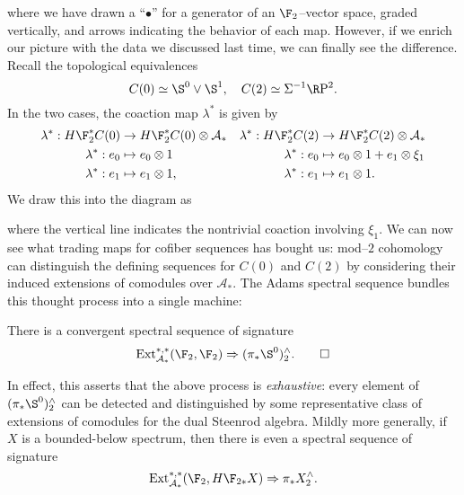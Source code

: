where we have drawn a ``$\bullet$'' for a generator of an $\F_2$--vector space, graded vertically, and arrows indicating the behavior of each map.  However, if we enrich our picture with the data we discussed last time, we can finally see the difference.  Recall the topological equivalences \[C(0) \simeq \S^0 \vee \S^1, \quad C(2) \simeq \Susp^{-1} \RP^2.\]  In the two cases, the coaction map $\lambda^*$ is given by
\begin{align*}
\lambda^*: H\F_2^* C(0) & \to H\F_2^* C(0) \otimes \mathcal A_* & \lambda^*: H\F_2^* C(2) & \to H\F_2^* C(2) \otimes \mathcal A_* \\
\lambda^*: e_0 & \mapsto e_0 \otimes 1 & \lambda^*: e_0 & \mapsto e_0 \otimes 1 + e_1 \otimes \xi_1 \\
\lambda^*: e_1 & \mapsto e_1 \otimes 1, & \lambda^*: e_1 & \mapsto e_1 \otimes 1.
\end{align*}
We draw this into the diagram as
\begin{center}
\end{center}
where the vertical line indicates the nontrivial coaction involving $\xi_1$.  We can now see what trading maps for cofiber sequences has bought us: mod--$2$ cohomology can distinguish the defining sequences for $C(0)$ and $C(2)$ by considering their induced extensions of comodules over $\mathcal A_*$.  The Adams spectral sequence bundles this thought process into a single machine:
\begin{theorem}
There is a convergent spectral sequence of signature \[\Ext_{\mathcal A_*}^{*, *}(\F_2, \F_2) \Rightarrow (\pi_* \S^0)^\wedge_2. \qed\]
\end{theorem}
In effect, this asserts that the above process is \emph{exhaustive}: every element of $(\pi_* \S^0)^\wedge_2$ can be detected and distinguished by some representative class of extensions of comodules for the dual Steenrod algebra.  Mildly more generally, if $X$ is a bounded-below spectrum, then there is even a spectral sequence of signature \[\Ext_{\mathcal A_*}^{*, *}(\F_2, H\F_{2*} X) \Rightarrow \pi_* X^\wedge_2.\]

